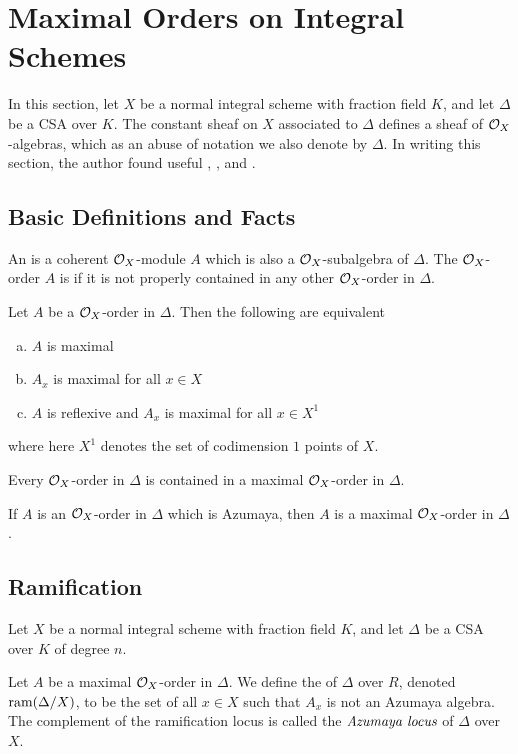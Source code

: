 \section{Maximal Orders on Integral Schemes}
In this section, let $X$ be a normal integral scheme with fraction field $K$, and let $\Delta$ be a CSA over $K$.  The constant sheaf on $X$ associated to $\Delta$ defines a sheaf of $\mathcal{O}_X$-algebras, which as an abuse of notation we also denote by $\Delta$.  In writing this section, the author found useful \cite{milne2012lectures}, \cite{bruyn2007noncommutative}, and \cite{Artin&deJong}.
\subsection{Basic Definitions and Facts}
\begin{defn}
An  is a coherent $\mathcal{O}_X$-module $A$ which is also a $\mathcal{O}_X$-subalgebra of $\Delta$.  The $\mathcal{O}_X$-order $A$ is  if it is not properly contained in any other $\mathcal{O}_X$-order in $\Delta$.
\end{defn}

\begin{prop}
Let $A$ be a $\mathcal{O}_X$-order in $\Delta$.  Then the following are equivalent
\begin{enumerate}[(a)]
\item  $A$ is maximal
\item  $A_x$ is maximal for all $x\in X$
\item  $A$ is reflexive and $A_x$ is maximal for all $x\in X^1$
\end{enumerate}
where here $X^1$ denotes the set of codimension $1$ points of $X$.
\end{prop}

\begin{prop}
Every $\mathcal{O}_X$-order in $\Delta$ is contained in a maximal $\mathcal{O}_X$-order in $\Delta$.
\end{prop}

\begin{prop}
If $A$ is an $\mathcal{O}_X$-order in $\Delta$ which is Azumaya, then $A$ is a maximal $\mathcal{O}_X$-order in $\Delta$.
\end{prop}

\subsection{Ramification}
Let $X$ be a normal integral scheme with fraction field $K$, and let $\Delta$ be a CSA over $K$ of degree $n$.
\begin{defn}
Let $A$ be a maximal $\mathcal{O}_X$-order in $\Delta$.  We define the  of $\Delta$ over $R$, denoted $\textnormal{ram}(\Delta/X)$, to be the set of all $x\in X$ such that $A_x$ is not an Azumaya algebra.  The complement of the ramification locus is called the $\textit{Azumaya locus}$ of $\Delta$ over $X$.
\end{defn}

